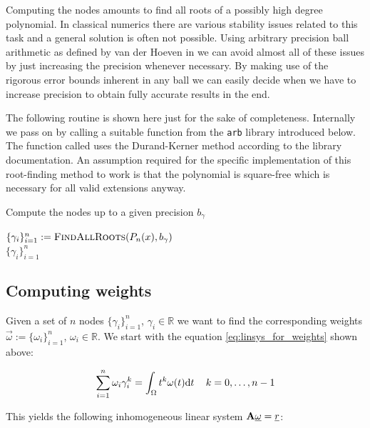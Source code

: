 \documentclass[a4paper,10pt]{article}
\begin{document}
Computing the nodes amounts to find all roots of a possibly high degree
polynomial. In classical numerics there are various stability issues related
to this task and a general solution is often not possible. Using arbitrary precision
ball arithmetic as defined by van der Hoeven in \cite{vdH:ball:greifswald, vdH:ball}
we can avoid almost all of these issues by just increasing the precision
whenever necessary. By making use of the rigorous error bounds inherent in any ball
we can easily decide when we have to increase precision to obtain fully accurate
results in the end.

The following routine is shown here just for the sake of completeness. Internally
we pass on by calling a suitable function from the \texttt{arb} library introduced below.
The function called uses the Durand-Kerner method according to the library documentation.
An assumption required for the specific implementation of this root-finding method to work
is that the polynomial is square-free which is necessary for all valid extensions anyway.

\begin{algorithm}
  \caption{Compute the nodes up to a given precision $b_{\gamma}$}
  \begin{algorithmic}
    \State $\{\gamma_i\}_{i=1}^{n} := \textsc{FindAllRoots}(P_n(x), b_{\gamma})$ \\
    \Return $\{\gamma_i\}_{i=1}^{n}$
    \EndProcedure
  \end{algorithmic}
\end{algorithm}


\subsection{Computing weights}

Given a set of $n$ nodes $\{\gamma_i\}_{i=1}^{n}$,  $\gamma_i \in \mathbb{R}$ we want
to find the corresponding weights $\vec{\omega} := \{\omega_i\}_{i=1}^{n}$, $\omega_i \in \mathbb{R}$.
We start with the equation \eqref{eq:linsys_for_weights} shown above:

\begin{equation}
  \sum_{i=1}^{n} \omega_i \gamma_i^k = \int_{\Omega} t^k \omega(t) \mathrm{d}t \,
  \quad k = 0, \ldots, n-1
\end{equation}

This yields the following inhomogeneous linear system $\mathbf{A} \underline{\omega} = \underline{r}$:
\end{document}
